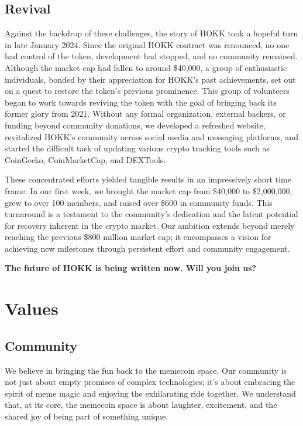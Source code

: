 \documentclass{article}
\begin{document}
\subsection{Revival}
Against the backdrop of these challenges, the story of HOKK took a hopeful turn in late January 2024. Since the original HOKK contract was renounced, no one had control of the token, development had stopped, and no community remained. Although the market cap had fallen to around \$40,000, a group of enthusiastic individuals, bonded by their appreciation for HOKK's past achievements, set out on a quest to restore the token's previous prominence. This group of volunteers began to work towards reviving the token with the goal of bringing back its former glory from 2021. Without any formal organization, external backers, or funding beyond community donations, we developed a refreshed website, revitalized HOKK's community across social media and messaging platforms, and started the difficult task of updating various crypto tracking tools such as CoinGecko, CoinMarketCap, and DEXTools.

These concentrated efforts yielded tangible results in an impressively short time frame. In our first week, we brought the market cap from \$40,000 to \$2,000,000, grew to over 100 members, and raised over \$600 in community funds. This turnaround is a testament to the community's dedication and the latent potential for recovery inherent in the crypto market. Our ambition extends beyond merely reaching the previous \$800 million market cap; it encompasses a vision for achieving new milestones through persistent effort and community engagement.

\bigskip
{\raggedleft \textbf{The future of HOKK is being written now. Will you join us?}}

\newpage
\section{Values}
\subsection{Community}
We believe in bringing the fun back to the memecoin space. Our community is not just about empty promises of complex technologies; it's about embracing the spirit of meme magic and enjoying the exhilarating ride together. We understand that, at its core, the memecoin space is about laughter, excitement, and the shared joy of being part of something unique.
\end{document}
